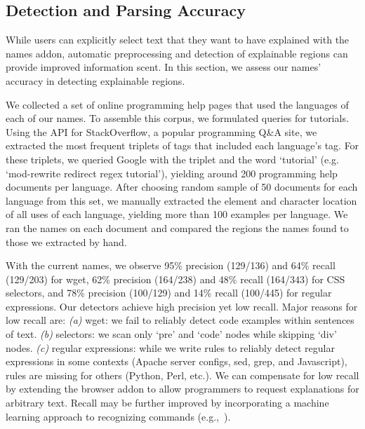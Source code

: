 \subsection{Detection and Parsing Accuracy}
\begin{changes}
While users can explicitly select text that they want to have explained with the \Glspl{name} addon, automatic preprocessing and detection of explainable regions can provide improved information scent.
In this section, we assess our \Glspl{name}' accuracy in detecting explainable regions.

We collected a set of online programming help pages that used the languages of each of our \Glspl{name}.
To assemble this corpus, we formulated queries for tutorials.
Using the API for StackOverflow, a popular programming Q\&A site, we extracted the most frequent triplets of tags that included each language's tag.
For these triplets, we queried Google with the triplet and the word `tutorial' (e.g. `mod-rewrite redirect regex tutorial'), yielding around 200 programming help documents per language. %
After choosing random sample of 50 documents for each language from this set, 
we manually extracted the element and character location of all uses of each language, yielding more than 100 examples per language.
We ran the \Glspl{name} on each document and compared the regions the \Glspl{name} found to those we extracted by hand.

With the current \Glspl{name}, we observe 95\% precision (129/136) and 64\% recall (129/203) for wget, 62\% precision (164/238) and 48\% recall (164/343) for CSS selectors, and 78\% precision (100/129) and 14\% recall (100/445) for regular expressions.
Our detectors achieve high precision yet low recall.
Major reasons for low recall are:
\emph{(a)} wget: we fail to reliably detect code examples within sentences of text.
\emph{(b)} selectors: we scan only `pre' and `code' nodes while skipping `div' nodes.
\emph{(c)} regular expressions: while we write rules to reliably detect regular expressions in some contexts (Apache server configs, sed, grep, and Javascript), rules are missing for others (Python, Perl, etc.).
We can compensate for low recall by extending the browser addon to allow programmers to request explanations for arbitrary text.
Recall may be further improved by incorporating a machine learning approach to recognizing commands (e.g.,~\cite{pavel_browsing_2013}).


\end{changes}
